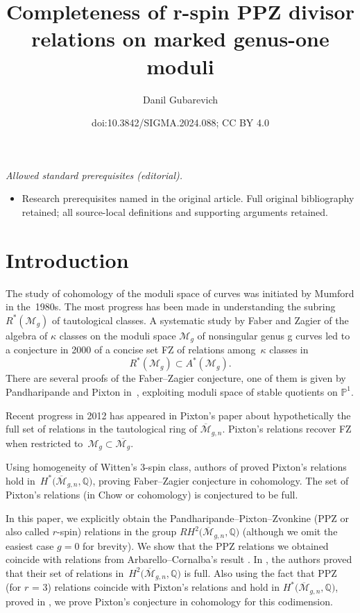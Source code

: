 \documentclass[10pt,a4paper]{amsart}
\title{Completeness of r-spin PPZ divisor relations on marked genus-one moduli}
\author{Danil Gubarevich}
\date{doi:10.3842/SIGMA.2024.088; CC BY 4.0}
\def\oM{\overline{\mathcal{M}}}
\numberwithin{equation}{section}
\begin{document}
\maketitle
\noindent\textit{Allowed standard prerequisites (editorial).}\begin{itemize}
\item Research prerequisites named in the original article. Full original bibliography retained; all source-local definitions and supporting arguments retained.
\end{itemize}\medskip
\section{Introduction}

The study of cohomology of the moduli space of curves was initiated by Mumford \cite{M} in the~1980s. The most progress has been made in understanding the subring $R^*(\mathcal{M}_{g})$ of tautological classes. A systematic study by Faber and Zagier of the algebra of $\kappa$ classes on the moduli space $\mathcal{M}_{g}$ of nonsingular genus g curves led to a conjecture in 2000 of a concise set FZ of relations among~$\kappa$ classes in
\[
R^*(\mathcal{M}_{g}) \subset A^*(\mathcal{M}_{g}).
\]
 There are several proofs of the Faber--Zagier conjecture, one of them is given by Pandharipande and Pixton in~\cite{PP}, exploiting moduli space of stable quotients on $\mathbb{P}^1$.

Recent progress in 2012 has appeared in Pixton's paper \cite{Pix} about hypothetically the full set of relations in the tautological ring of $\oM_{g,n}$. Pixton's relations recover FZ when restricted to~${\mathcal{M}_{g}\subset \overline{\mathcal{M}_{g}}}$.

Using homogeneity of Witten's 3-spin class,
authors of \cite{PPZ} proved Pixton's relations hold in~$H^*\big(\oM_{g,n},\mathbb{Q}\big)$, proving Faber--Zagier conjecture in cohomology.
The set of Pixton's relations (in Chow or cohomology) is conjectured to be full.

In this paper, we explicitly obtain the Pandharipande--Pixton--Zvonkine (PPZ or also called $r$-spin) relations \cite{PPZ,PPZ16} in the group $RH^2\big(\oM_{g,n},\mathbb{Q}\big)$
(although we omit the easiest case $g=0$ for brevity). We show that the PPZ relations we obtained coincide with relations from Arbarello--Cornalba's result \cite[Theorem 2.2]{Cor}. In \cite{Cor}, the authors proved that their set of relations in~$H^2\big(\oM_{g,n},\mathbb{Q}\big)$ is full. Also
using the fact that PPZ (for $r$ = 3) relations coincide with Pixton's relations and hold in $H^*\big(\oM_{g,n}, \mathbb{Q}\big)$, proved in \cite{PPZ}, we prove Pixton's conjecture in cohomology for this codimension.
\end{document}
